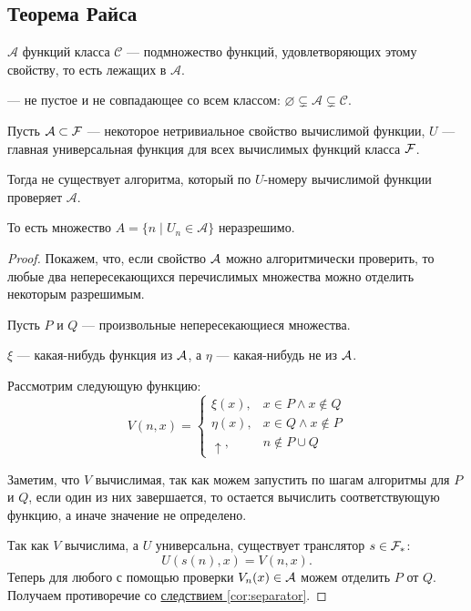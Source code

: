 \subsection{Теорема Райса}
\begin{defn} 
	 $ \mathcal{A}$ функций класса $ \mathcal{C}$ --- подмножество функций, удовлетворяющих этому свойству, то есть лежащих в $ \mathcal{A}$.

	\noindent
	 --- не пустое и не совпадающее со всем классом: $ \varnothing \subsetneq \mathcal{A} \subsetneq \mathcal{C}$.
\end{defn}

\begin{thm}
	Пусть $ \mathcal{A} \subset \mathcal{F}$ --- некоторое нетривиальное свойство вычислимой функции, 
	$ U$ --- главная универсальная функция для всех вычислимых функций класса $ \mathcal{F}$.

	Тогда не существует алгоритма, который по  $ U$-номеру вычислимой функции проверяет $ \mathcal{A}$. 

	То есть множество $ A = \{n \mid U_n \in \mathcal{A}\}$ неразрешимо.
\end{thm}
\begin{proof}
    Покажем, что, если свойство $ \mathcal{A}$ можно алгоритмически проверить, то любые два непересекающихся перечислимых множества можно отделить некоторым разрешимым.

	Пусть $ P$ и $ Q$ --- произвольные непересекающиеся множества. 

	$ \xi$ --- какая-нибудь функция из $ \mathcal{A}$, а $ \eta$ --- какая-нибудь не из $ \mathcal{A}$.

	Рассмотрим следующую функцию:
	\[
		V(n, x) = 
		\begin{cases}
			\xi(x), & x \in P \land x \notin Q \\
			\eta(x), & x \in Q \land x \notin P\\
			\uparrow, & n \notin P \cup Q
		\end{cases}
	\] 

	Заметим, что $ V$ вычислимая, так как можем запустить по шагам алгоритмы для $ P$ и $ Q$, если один из них завершается, то остается вычислить соответствующую функцию, а иначе значение не определено.

	Так как $ V$ вычислима, а $ U$ универсальна, существует транслятор $ s \in \mathcal{F}_{*}$:
	\[
		U(s(n), x) = V(n, x)
	.\] 
	Теперь для любого с помощью проверки  $ V_n(x) \in  \mathcal{A}$ можем отделить $ P$ от $ Q$. Получаем противоречие со \hyperref[cor:separator]{следствием \ref{cor:separator}}.
\end{proof}

